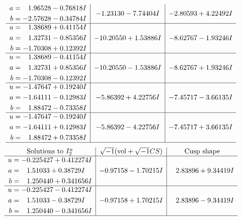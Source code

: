 \documentclass[1p]{elsarticle_modified}
\theoremstyle{definition}
\newcommand{\I}{\sqrt{-1}}
\begin{document}
$$\begin{array}{c|c|c}
\begin{aligned}
a &= \phantom{-}1.96528 - 0.76818 I \\
b &= -2.57628 - 0.34784 I\end{aligned}
 & -1.23130 - 7.74404 I & -2.80593 + 4.22492 I \\ \hline\begin{aligned}
u &= \phantom{-}1.38689 + 0.41154 I \\
a &= \phantom{-}1.32731 - 0.85356 I \\
b &= -1.70308 + 0.12392 I\end{aligned}
 & -10.20550 + 1.53886 I & -8.62767 - 1.93246 I \\ \hline\begin{aligned}
u &= \phantom{-}1.38689 - 0.41154 I \\
a &= \phantom{-}1.32731 + 0.85356 I \\
b &= -1.70308 - 0.12392 I\end{aligned}
 & -10.20550 - 1.53886 I & -8.62767 + 1.93246 I \\ \hline\begin{aligned}
u &= -1.47647 + 0.19240 I \\
a &= -1.64111 - 0.12983 I \\
b &= \phantom{-}1.88472 - 0.73358 I\end{aligned}
 & -5.86392 + 4.22756 I & -7.45717 - 3.66135 I \\ \hline\begin{aligned}
u &= -1.47647 - 0.19240 I \\
a &= -1.64111 + 0.12983 I \\
b &= \phantom{-}1.88472 + 0.73358 I\end{aligned}
 & -5.86392 - 4.22756 I & -7.45717 + 3.66135 I\\
 \hline 
 \end{array}$$\newpage$$\begin{array}{c|c|c}  
\text{Solutions to }I^u_{2}& \I (\text{vol} + \sqrt{-1}CS) & \text{Cusp shape}\\
 \hline 
\begin{aligned}
u &= -0.225427 + 0.412274 I \\
a &= \phantom{-}1.51033 + 0.38729 I \\
b &= \phantom{-}1.250440 + 0.341656 I\end{aligned}
 & -0.97158 - 1.70215 I & \phantom{-}2.83896 + 9.34419 I \\ \hline\begin{aligned}
u &= -0.225427 - 0.412274 I \\
a &= \phantom{-}1.51033 - 0.38729 I \\
b &= \phantom{-}1.250440 - 0.341656 I\end{aligned}
 & -0.97158 + 1.70215 I & \phantom{-}2.83896 - 9.34419 I\\
 \hline 
 \end{array}$$\newpage
\end{document}
